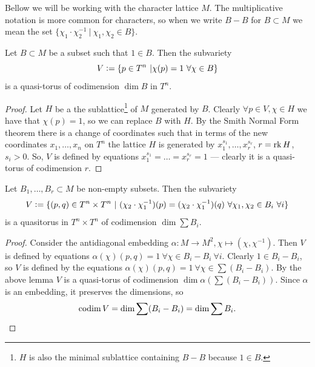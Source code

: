 \begin{remark}
    Bellow we will be working with the character lattice $M$. The multiplicative notation is more common for characters, so when we write $B - B$ for $B \subset M$ we mean the set $\{ \chi_1 \cdot \chi_2^{-1}\ |\ \chi_1, \chi_2  \in B \}$.
\end{remark}

\begin{lemma}
    Let $B \subset M$ be a subset such that $1 \in B$. Then the subvariety 
    \[
    V \defeq \{ p \in T^n\ | \chi(p) = 1 \ \forall \chi \in B \}
    \]
    is a quasi-torus of codimension $\dim B$ in $T^n$.
\end{lemma}
\begin{proof}
    Let $H$ be a the sublattice\footnote{$H$ is also the minimal sublattice containing $B - B$ because $1 \in B$. } of $M$ generated by $B$. Clearly $\forall p \in V, \chi \in H$ we have that $\chi(p) = 1$, so we can replace $B$ with $H$. By the Smith Normal Form theorem there is a change of coordinates such that in terms of the new coordinates $x_1, \dots, x_n$ on $T^n$ the lattice $H$ is generated by $x_1^{s_1}, \dots, x_r^{s_r}$, $r = \operatorname{rk} H$, $s_i > 0$. So, $V$ is defined by equations $x_1^{s_1} = \dots = x_r^{s_r} = 1$ --- clearly it is a quasi-torus of codimension $r$.
\end{proof}

\begin{claim}\label{claim:prelim_quasisubtori}
    Let $B_1, \dots, B_r \subset M$ be non-empty subsets. Then the subvariety 
    \[
    V \vcentcolon= \{ (p, q) \in T^n \times T^n\ |\ (\chi_2 \cdot \chi_1^{-1}) (p) = (\chi_2 \cdot \chi_1^{-1})(q)\  \forall \chi_1, \chi_2 \in B_i\ \forall i\} 
    \]
    is a quasitorus in $T^n \times T^n$ of codimension $\dim \sum B_i$.
\end{claim}
\begin{proof}
    Consider the antidiagonal embedding $\alpha: M \to M^2, \chi \mapsto (\chi, \chi^{-1})$. Then $V$ is defined by equations $\alpha(\chi)(p, q) = 1 \ \forall \chi \in B_i - B_i\ \forall i$. Clearly $1 \in B_i - B_i$, so $V$ is defined by the equations $\alpha(\chi)(p, q) = 1\ \forall \chi \in \sum (B_i - B_i)$. By the above lemma $V$ is a quasi-torus of codimension $\dim \alpha\left(\sum (B_i - B_i) \right)$. Since $\alpha$ is an embedding, it preserves the dimensions, so
    \[
    \operatorname{codim} V = \dim \sum (B_i - B_i) = \dim \sum B_i.
    \]
\end{proof}

